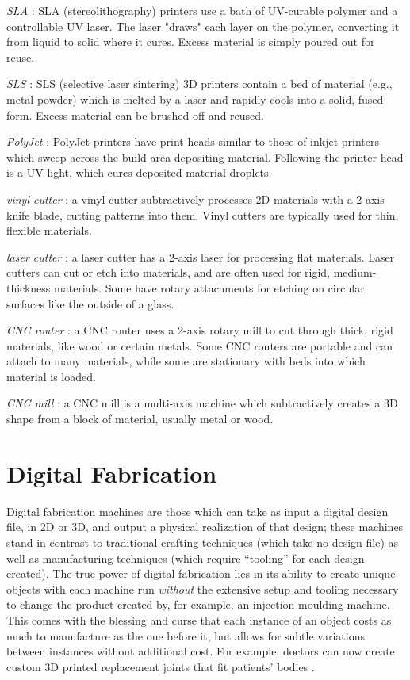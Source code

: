 \emph{SLA} : SLA (stereolithography) printers use a bath of UV-curable polymer and a controllable UV laser. The laser "draws" each layer on the polymer, converting it from liquid to solid where it cures. Excess material is simply poured out for reuse.

\emph{SLS} : SLS (selective laser sintering) 3D printers contain a bed of material (e.g., metal powder) which is melted by a laser and rapidly cools into a solid, fused form. Excess material can be brushed off and reused.

\emph{PolyJet} : PolyJet printers have print heads similar to those of inkjet printers which sweep across the build area depositing material. Following the printer head is a UV light, which cures deposited material droplets.

\emph{vinyl cutter} : a vinyl cutter subtractively processes 2D materials with a 2-axis knife blade, cutting patterns into them. Vinyl cutters are typically used for thin, flexible materials.

\emph{laser cutter} : a laser cutter has a 2-axis laser for processing flat materials. Laser cutters can cut or etch into materials, and are often used for rigid, medium-thickness materials. Some have rotary attachments for etching on circular surfaces like the outside of a glass.

\emph{CNC router} : a CNC router uses a 2-axis rotary mill to cut through thick, rigid materials, like wood or certain metals. Some CNC routers are portable and can attach to many materials, while some are stationary with beds into which material is loaded.

\emph{CNC mill} : a CNC mill is a multi-axis machine which subtractively creates a 3D shape from a block of material, usually metal or wood.

\section{Digital Fabrication}

Digital fabrication machines are those which can take as input a digital design file, in 2D or 3D, and output a physical realization of that design; these machines stand in contrast to traditional crafting techniques (which take no design file) as well as manufacturing techniques (which require ``tooling'' for each design created). The true power of digital fabrication lies in its ability to create unique objects with each machine run \emph{without} the extensive setup and tooling necessary to change the product created by, for example, an injection moulding machine. This comes with the blessing and curse that each instance of an object costs as much to manufacture as the one before it, but allows for subtle variations between instances without additional cost. For example, doctors can now create custom 3D printed replacement joints that fit patients' bodies \cite{findref}.

